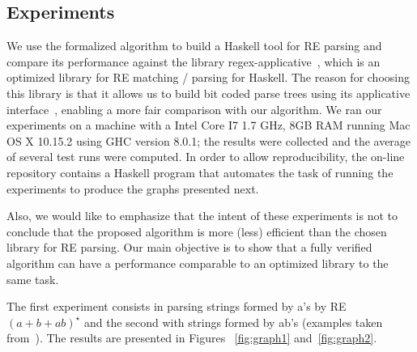 \documentclass[review]{elsarticle}
\theoremstyle{definition}
\begin{document}
\subsection{Experiments}

We use the formalized algorithm to build a Haskell tool for RE parsing and
compare its performance against the library
regex-applicative~\cite{regex-applicative}, which is an optimized library for RE
matching / parsing for Haskell. The reason for choosing this library is that it allows us to 
build bit coded parse trees using its applicative interface~\cite{Mcbride2008},
enabling a more fair comparison with our algorithm.
We ran our experiments on a machine with a Intel Core I7 1.7 GHz, 8GB RAM 
running Mac OS X 10.15.2 using GHC version 8.0.1; the results were collected
and the average of several test runs were computed. In order to allow
reproducibility, the on-line repository contains a Haskell program that
automates the task of running the experiments to produce the graphs presented next.

Also, we would like to emphasize that the intent of these experiments is not to
conclude that the proposed algorithm is more (less) efficient than the chosen 
library for RE parsing. Our main objective is to show that a fully verified
algorithm can have a performance comparable to an optimized library to the 
same task. 

The first experiment consists in parsing strings formed by a's by RE 
$(a + b + ab)^\star$ and the second with strings formed by ab's 
(examples taken from~\cite{Sulzmann14}). The results are presented in Figures
~\ref{fig:graph1} and~\ref{fig:graph2}.
\end{document}
